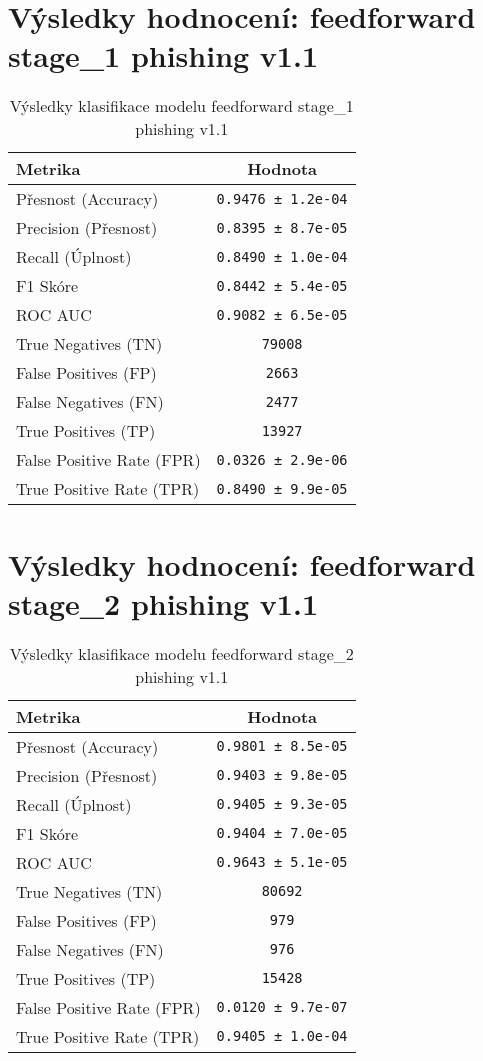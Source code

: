 \section*{Výsledky hodnocení: feedforward stage_1 phishing v1.1}
\begin{table}[h!]
\centering
\begin{tabular}{|l|c|}
\hline
\textbf{Metrika} & \textbf{Hodnota} \\
\hline
Přesnost (Accuracy) & \texttt{0.9476 ± 1.2e-04} \\
Precision (Přesnost) & \texttt{0.8395 ± 8.7e-05} \\
Recall (Úplnost) & \texttt{0.8490 ± 1.0e-04} \\
F1 Skóre & \texttt{0.8442 ± 5.4e-05} \\
ROC AUC & \texttt{0.9082 ± 6.5e-05} \\
True Negatives (TN) & \texttt{79008} \\
False Positives (FP) & \texttt{2663} \\
False Negatives (FN) & \texttt{2477} \\
True Positives (TP) & \texttt{13927} \\
False Positive Rate (FPR) & \texttt{0.0326 ± 2.9e-06} \\
True Positive Rate (TPR) & \texttt{0.8490 ± 9.9e-05} \\
\hline
\end{tabular}
\caption{Výsledky klasifikace modelu feedforward stage_1 phishing v1.1}
\label{tab:phishing_feedforward}
\end{table}

\section*{Výsledky hodnocení: feedforward stage_2 phishing v1.1}
\begin{table}[h!]
\centering
\begin{tabular}{|l|c|}
\hline
\textbf{Metrika} & \textbf{Hodnota} \\
\hline
Přesnost (Accuracy) & \texttt{0.9801 ± 8.5e-05} \\
Precision (Přesnost) & \texttt{0.9403 ± 9.8e-05} \\
Recall (Úplnost) & \texttt{0.9405 ± 9.3e-05} \\
F1 Skóre & \texttt{0.9404 ± 7.0e-05} \\
ROC AUC & \texttt{0.9643 ± 5.1e-05} \\
True Negatives (TN) & \texttt{80692} \\
False Positives (FP) & \texttt{979} \\
False Negatives (FN) & \texttt{976} \\
True Positives (TP) & \texttt{15428} \\
False Positive Rate (FPR) & \texttt{0.0120 ± 9.7e-07} \\
True Positive Rate (TPR) & \texttt{0.9405 ± 1.0e-04} \\
\hline
\end{tabular}
\caption{Výsledky klasifikace modelu feedforward stage_2 phishing v1.1}
\label{tab:phishing_feedforward}
\end{table}


